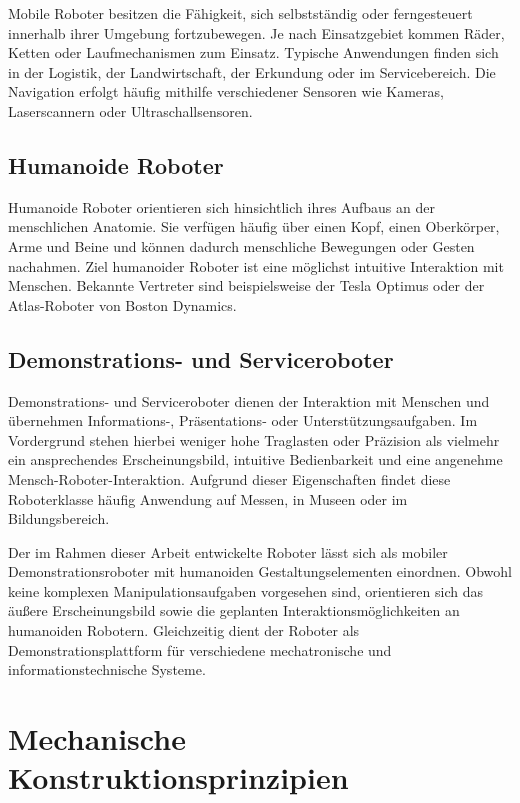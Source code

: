 Mobile Roboter besitzen die Fähigkeit, sich selbstständig oder ferngesteuert innerhalb ihrer Umgebung fortzubewegen. Je nach Einsatzgebiet kommen Räder, Ketten oder Laufmechanismen zum Einsatz. Typische Anwendungen finden sich in der Logistik, der Landwirtschaft, der Erkundung oder im Servicebereich. Die Navigation erfolgt häufig mithilfe verschiedener Sensoren wie Kameras, Laserscannern oder Ultraschallsensoren. \cite{siegwart2011mobile}

\subsection{Humanoide Roboter}

Humanoide Roboter orientieren sich hinsichtlich ihres Aufbaus an der menschlichen Anatomie. Sie verfügen häufig über einen Kopf, einen Oberkörper, Arme und Beine und können dadurch menschliche Bewegungen oder Gesten nachahmen. Ziel humanoider Roboter ist eine möglichst intuitive Interaktion mit Menschen. Bekannte Vertreter sind beispielsweise der Tesla Optimus oder der Atlas-Roboter von Boston Dynamics.

\subsection{Demonstrations- und Serviceroboter}

Demonstrations- und Serviceroboter dienen der Interaktion mit Menschen und übernehmen Informations-, Präsentations- oder Unterstützungsaufgaben. Im Vordergrund stehen hierbei weniger hohe Traglasten oder Präzision als vielmehr ein ansprechendes Erscheinungsbild, intuitive Bedienbarkeit und eine angenehme Mensch-Roboter-Interaktion. Aufgrund dieser Eigenschaften findet diese Roboterklasse häufig Anwendung auf Messen, in Museen oder im Bildungsbereich.

Der im Rahmen dieser Arbeit entwickelte Roboter lässt sich als mobiler Demonstrationsroboter mit humanoiden Gestaltungselementen einordnen. Obwohl keine komplexen Manipulationsaufgaben vorgesehen sind, orientieren sich das äußere Erscheinungsbild sowie die geplanten Interaktionsmöglichkeiten an humanoiden Robotern. Gleichzeitig dient der Roboter als Demonstrationsplattform für verschiedene mechatronische und informationstechnische Systeme.

\section{Mechanische Konstruktionsprinzipien}
\label{sec:Konstruktionsprinzipien}

